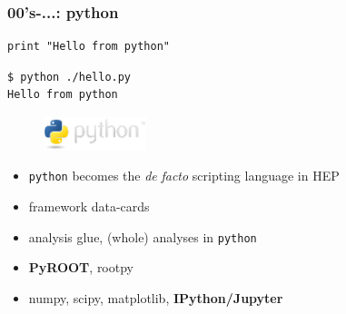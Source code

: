 \documentclass[9pt]{beamer}
\begin{document}
\begin{frame}[fragile]
\frametitle{00's-...: python}


	\begin{block}{}
\begin{verbatim}
print "Hello from python"
\end{verbatim}
	\end{block}{}

	\begin{exampleblock}{}
\begin{verbatim}
$ python ./hello.py
Hello from python
\end{verbatim}
	\end{exampleblock}{}


\begin{figure}[h]
\begin{center}
\includegraphics[width=3cm,height=1cm]{_figs/my-python-logo.png}
\end{center}

\end{figure}

\begin{itemize}
\item \texttt{python} becomes the \emph{de} \emph{facto} scripting language in HEP
\item framework data-cards
\item analysis glue, (whole) analyses in \texttt{python}
\item \textbf{PyROOT}, rootpy
\item numpy, scipy, matplotlib, \textbf{IPython/Jupyter}
\end{itemize}


\end{frame}
\end{document}
